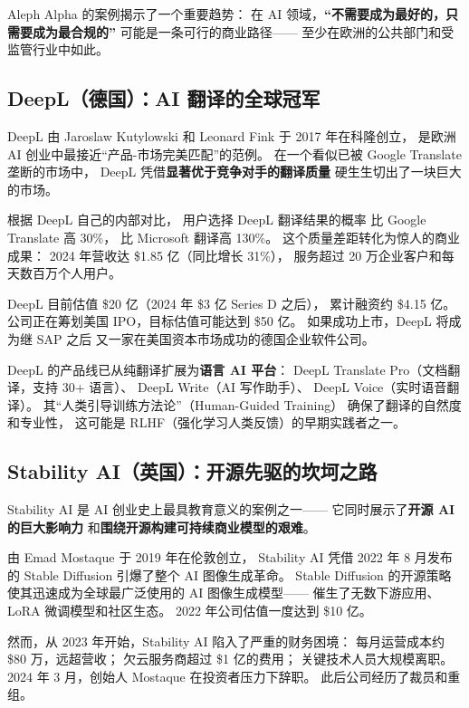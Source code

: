 Aleph Alpha 的案例揭示了一个重要趋势：
在 AI 领域，\textbf{``不需要成为最好的，只需要成为最合规的''}
可能是一条可行的商业路径——
至少在欧洲的公共部门和受监管行业中如此。

\subsection{DeepL（德国）：AI 翻译的全球冠军}

DeepL 由 Jaroslaw Kutylowski 和 Leonard Fink
于 2017 年在科隆创立，
是欧洲 AI 创业中最接近``产品-市场完美匹配''的范例。
在一个看似已被 Google Translate 垄断的市场中，
DeepL 凭借\textbf{显著优于竞争对手的翻译质量}
硬生生切出了一块巨大的市场。

根据 DeepL 自己的内部对比，
用户选择 DeepL 翻译结果的概率
比 Google Translate 高 30\%，
比 Microsoft 翻译高 130\%。
这个质量差距转化为惊人的商业成果：
2024 年营收达 \$1.85 亿（同比增长 31\%），
服务超过 20 万企业客户和每天数百万个人用户。

DeepL 目前估值 \$20 亿（2024 年 \$3 亿 Series D 之后），
累计融资约 \$4.15 亿。
公司正在筹划美国 IPO，目标估值可能达到 \$50 亿。
如果成功上市，DeepL 将成为继 SAP 之后
又一家在美国资本市场成功的德国企业软件公司。

DeepL 的产品线已从纯翻译扩展为\textbf{语言 AI 平台}：
DeepL Translate Pro（文档翻译，支持 30+ 语言）、
DeepL Write（AI 写作助手）、
DeepL Voice（实时语音翻译）。
其``人类引导训练方法论''（Human-Guided Training）
确保了翻译的自然度和专业性，
这可能是 RLHF（强化学习人类反馈）的早期实践者之一。

\subsection{Stability AI（英国）：开源先驱的坎坷之路}

Stability AI 是 AI 创业史上最具教育意义的案例之一——
它同时展示了\textbf{开源 AI 的巨大影响力}
和\textbf{围绕开源构建可持续商业模型的艰难}。

由 Emad Mostaque 于 2019 年在伦敦创立，
Stability AI 凭借 2022 年 8 月发布的 Stable Diffusion
引爆了整个 AI 图像生成革命。
Stable Diffusion 的开源策略使其迅速成为全球最广泛使用的
AI 图像生成模型——
催生了无数下游应用、LoRA 微调模型和社区生态。
2022 年公司估值一度达到 \$10 亿。

然而，从 2023 年开始，Stability AI 陷入了严重的财务困境：
每月运营成本约 \$80 万，远超营收；
欠云服务商超过 \$1 亿的费用；
关键技术人员大规模离职。
2024 年 3 月，创始人 Mostaque 在投资者压力下辞职。
此后公司经历了裁员和重组。

